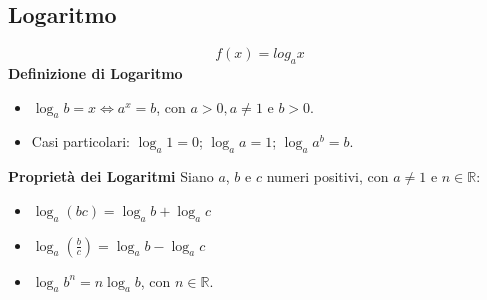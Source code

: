 \documentclass{book}
\begin{document}
\begin{definition}
    \subsection{Logaritmo}
    \[f(x) = log_{a}x\]
    \textbf{Definizione di Logaritmo}
    \begin{itemize}
        \item \(\log_a b = x \Leftrightarrow a^x = b\), con \(a > 0, a \neq 1\) e \(b > 0\).
        \item Casi particolari: \(\log_a 1 = 0\); \(\log_a a = 1\); \(\log_a a^b = b\).
    \end{itemize}
    \textbf{Proprietà dei Logaritmi}
    Siano \(a\), \(b\) e \(c\) numeri positivi, con \(a \neq 1\) e \(n \in \mathbb{R}\):
    \begin{itemize}
        \item \(\log_a (bc) = \log_a b + \log_a c\)
        \item \(\log_a \left( \frac{b}{c} \right) = \log_a b - \log_a c\)
        \item \(\log_a b^n = n \log_a b\), con \(n \in \mathbb{R}\).
    \end{itemize}
\end{definition}
\end{document}
